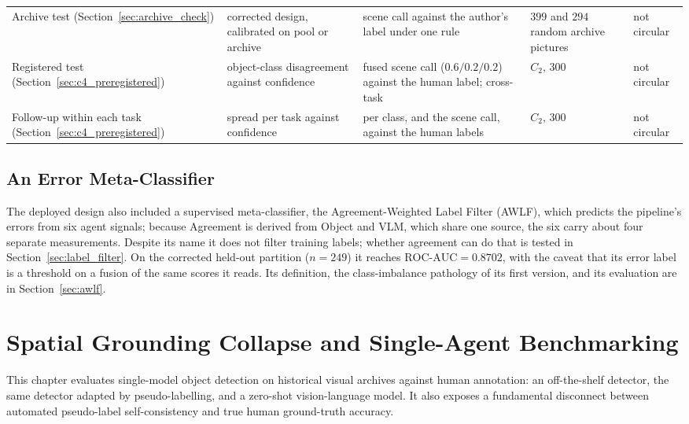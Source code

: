 \documentclass[12pt,a4paper]{report}
\begin{document}
\begin{table}[!htbp]
\begin{tabular}{>{\raggedright\arraybackslash}p{2.9cm} >{\raggedright\arraybackslash}p{2.5cm} >{\raggedright\arraybackslash}p{3.6cm} >{\raggedright\arraybackslash}p{2.6cm} >{\raggedright\arraybackslash}p{1.6cm}}
Archive test (Section~\ref{sec:archive_check}) & corrected design, calibrated on pool or archive & scene call against the author's label under one rule & $399$ and $294$ random archive pictures & not circular \\
Registered test (Section~\ref{sec:c4_preregistered}) & object-class disagreement against confidence & fused scene call ($0.6/0.2/0.2$) against the human label; cross-task & $C_2$, $300$ & not circular \\
Follow-up within each task (Section~\ref{sec:c4_preregistered}) & spread per task against confidence & per class, and the scene call, against the human labels & $C_2$, $300$ & not circular \\
\bottomrule
\end{tabular}
\end{table}

\section{An Error Meta-Classifier}
The deployed design also included a supervised meta-classifier, the Agreement-Weighted Label Filter (AWLF), which predicts the pipeline's errors from six agent signals; because Agreement is derived from Object and VLM, which share one source, the six carry about four separate measurements. Despite its name it does not filter training labels; whether agreement can do that is tested in Section~\ref{sec:label_filter}. On the corrected held-out partition ($n=249$) it reaches $\text{ROC-AUC} = 0.8702$, with the caveat that its error label is a threshold on a fusion of the same scores it reads. Its definition, the class-imbalance pathology of its first version, and its evaluation are in Section~\ref{sec:awlf}.

\chapter{Spatial Grounding Collapse and Single-Agent Benchmarking}
\label{ch:spatial_collapse}

This chapter evaluates single-model object detection on historical visual archives against human annotation: an off-the-shelf detector, the same detector adapted by pseudo-labelling, and a zero-shot vision-language model. It also exposes a fundamental disconnect between automated pseudo-label self-consistency and true human ground-truth accuracy.
\end{document}
